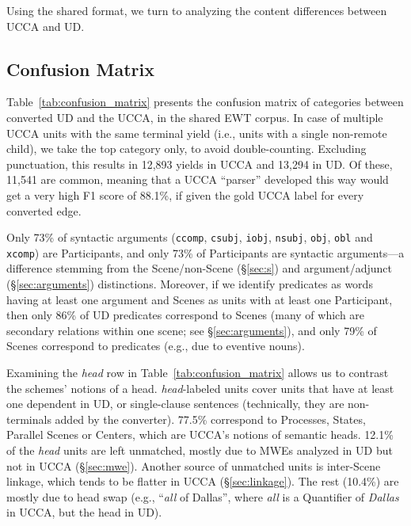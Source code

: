 \documentclass[11pt,a4paper]{article}
\begin{document}
Using the shared format,
we turn to analyzing the content differences between UCCA and UD.


\subsection{Confusion Matrix}\label{sec:confusion}

Table~\ref{tab:confusion_matrix} presents the confusion matrix of categories between converted UD
and the UCCA, in the shared EWT corpus.
In case of multiple UCCA units with the same terminal yield (i.e., units with a single non-remote child),
we take the top category only, to avoid double-counting.
Excluding punctuation, this results in 12,893 yields in UCCA and
13,294 in UD.
Of these, 11,541 are common, meaning that a UCCA ``parser'' developed this way
would get a very high F1 score
of 88.1\%, if given the gold UCCA label for every converted edge.

Only 73\% of syntactic arguments
(\texttt{ccomp}, \texttt{csubj}, \texttt{iobj}, \texttt{nsubj}, \texttt{obj}, \texttt{obl} and \texttt{xcomp})
are Participants,
and only 73\% of Participants are syntactic arguments---a difference stemming from
the Scene/non-Scene (\S\ref{sec:s}) and argument/adjunct (\S\ref{sec:arguments}) distinctions.
Moreover, if we identify predicates as words having at least one argument
and Scenes as units with at least one Participant,
then only 86\% of UD predicates correspond to Scenes (many of which are secondary relations within one scene; see \S\ref{sec:arguments}),
and only 79\% of Scenes correspond to predicates (e.g., due to eventive nouns).

Examining the {\it head} row in Table~\ref{tab:confusion_matrix} allows
us to contrast the schemes' notions of a head. 
{\it head}-labeled units cover units that have at least
one dependent in UD, or single-clause sentences (technically, they are non-terminals added by the converter).
77.5\% correspond to Processes, States, Parallel Scenes or Centers,
which are UCCA's notions of semantic heads.
12.1\% of the {\it head} units are left unmatched, mostly due to MWEs analyzed in
UD but not in UCCA (\S\ref{sec:mwe}).
Another source of unmatched units is inter-Scene linkage, which tends to be flatter in
UCCA (\S\ref{sec:linkage}).
The rest (10.4\%) are mostly due to head swap (e.g., ``\textit{all} of Dallas'', where \textit{all}
is a Quantifier of \textit{Dallas} in UCCA, but the head in UD).
\end{document}
